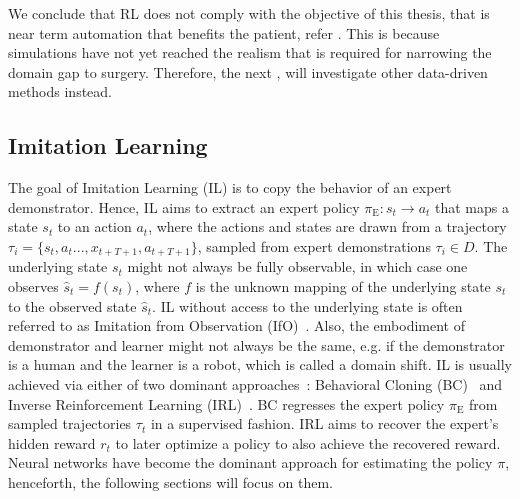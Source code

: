 We conclude that RL does not comply with the objective of this thesis, that is near term automation that benefits the patient, refer . This is because simulations have not yet reached the realism that is required for narrowing the domain gap to surgery. Therefore, the next , will investigate other data-driven methods instead.

\subsection{Imitation Learning}
\label{in:sec:imitation_learning}
The goal of Imitation Learning (IL) is to copy the behavior of an expert demonstrator. Hence, IL aims to extract an expert policy $\pi_\text{E}: s_t \rightarrow a_t$ that maps a state $s_t$ to an action $a_t$, where the actions and states are drawn from a trajectory $\tau_i = \{s_t,a_t...,x_{t+T+1},a_{t+T+1}\}$, sampled from expert demonstrations $\tau_i \in D$. The underlying state $s_t$ might not always be fully observable, in which case one observes $\hat{s}_t = f(s_t)$, where $f$ is the unknown mapping of the underlying state $s_t$ to the observed state $\hat{s}_t$. IL without access to the underlying state is often referred to as Imitation from Observation (IfO)~\cite{liu2018imitation}. Also, the embodiment of demonstrator and learner might not always be the same, e.g. if the demonstrator is a human and the learner is a robot, which is called a domain shift. IL is usually achieved via either of two dominant approaches~\cite{osa2018algorithmic}: Behavioral Cloning (BC)~\cite{pomerleau1991efficient} and Inverse Reinforcement Learning (IRL)~\cite{ng2000algorithms}. BC regresses the expert policy $\pi_\text{E}$ from sampled trajectories $\tau_t$ in a supervised fashion. IRL aims to recover the expert's hidden reward $r_t$ to later optimize a policy to also achieve the recovered reward. Neural networks have become the dominant approach for estimating the policy $\pi$, henceforth, the following sections will focus on them.

